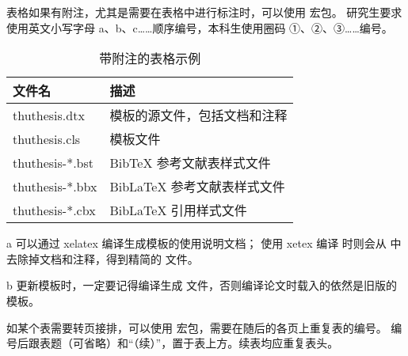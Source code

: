 表格如果有附注，尤其是需要在表格中进行标注时，可以使用  宏包。
研究生要求使用英文小写字母 a、b、c……顺序编号，本科生使用圈码 ①、②、③……编号。

\begin{table}
  \centering
  \begin{threeparttable}[c]
    \caption{带附注的表格示例}
    \label{tab:three-part-table}
    \begin{tabular}{ll}
      \toprule
      文件名                 & 描述                         \\
      \midrule
      thuthesis.dtx\tnote{a} & 模板的源文件，包括文档和注释 \\
      thuthesis.cls\tnote{b} & 模板文件                     \\
      thuthesis-*.bst        & BibTeX 参考文献表样式文件    \\
      thuthesis-*.bbx        & BibLaTeX 参考文献表样式文件  \\
      thuthesis-*.cbx        & BibLaTeX 引用样式文件        \\
      \bottomrule
    \end{tabular}
    \begin{tablenotes}
      \item [a] 可以通过 xelatex 编译生成模板的使用说明文档；
        使用 xetex 编译  时则会从  中去除掉文档和注释，得到精简的  文件。
      \item [b] 更新模板时，一定要记得编译生成  文件，否则编译论文时载入的依然是旧版的模板。
    \end{tablenotes}
  \end{threeparttable}
\end{table}

如某个表需要转页接排，可以使用  宏包，需要在随后的各页上重复表的编号。
编号后跟表题（可省略）和“（续）”，置于表上方。续表均应重复表头。

